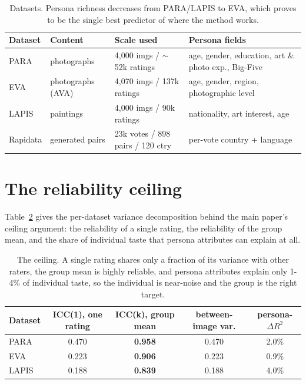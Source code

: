 \documentclass{article}
\begin{document}
\begin{table}[h]
  \caption{Datasets. Persona richness decreases from PARA/LAPIS to EVA, which proves to be the single best predictor of where the method works.}
  \label{tab:data}
  \centering
  \small
  \setlength{\tabcolsep}{5pt}
  \begin{tabular}{lllp{4.6cm}}
    \toprule
    Dataset & Content & Scale used & Persona fields \\
    \midrule
    PARA     & photographs        & 4{,}000 imgs / $\sim$52k ratings & age, gender, education, art \& photo exp., Big-Five \\
    EVA      & photographs (AVA)  & 4{,}070 imgs / 137k ratings      & age, gender, region, photographic level \\
    LAPIS    & paintings          & 4{,}000 imgs / 90k ratings       & nationality, art interest, age \\
    Rapidata & generated pairs    & 23k votes / 898 pairs / 120 ctry & per-vote country + language \\
    \bottomrule
  \end{tabular}
\end{table}

\section{The reliability ceiling}
Table~\ref{tab:ceiling} gives the per-dataset variance decomposition behind the main paper's ceiling argument: the reliability of a single rating, the reliability of the group mean, and the share of individual taste that persona attributes can explain at all.

\begin{table}[h]
  \caption{The ceiling. A single rating shares only a fraction of its variance with other raters, the group mean is highly reliable, and persona attributes explain only 1-4\% of individual taste, so the individual is near-noise and the group is the right target.}
  \label{tab:ceiling}
  \centering
  \small
  \begin{tabular}{lcccc}
    \toprule
    Dataset & ICC(1), one rating & ICC(k), group mean & between-image var. & persona-$\Delta R^2$ \\
    \midrule
    PARA  & 0.470 & \textbf{0.958} & 0.470 & 2.0\% \\
    EVA   & 0.223 & \textbf{0.906} & 0.223 & 0.9\% \\
    LAPIS & 0.188 & \textbf{0.839} & 0.188 & 4.0\% \\
    \bottomrule
  \end{tabular}
\end{table}
\end{document}
